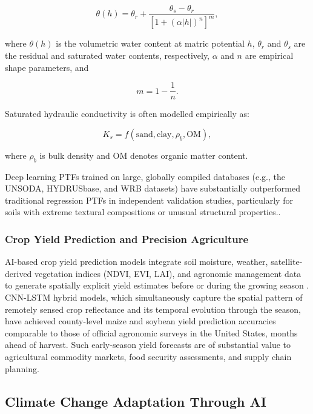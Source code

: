 \documentclass[land,article,submit,pdftex,moreauthors]{Definitions/mdpi}
\numberwithin{equation}{section}
\begin{document}
\begin{equation}
\theta(h)
=
\theta_r
+
\frac{
\theta_s-\theta_r
}{
\left[
1+(\alpha |h|)^n
\right]^m
},
\end{equation}

where $\theta(h)$ is the volumetric water content at matric potential $h$, $\theta_r$ and $\theta_s$ are the residual and saturated water contents, respectively, $\alpha$ and $n$ are empirical shape parameters, and

\begin{equation}
m = 1 - \frac{1}{n}.
\end{equation}

Saturated hydraulic conductivity is often modelled empirically as:

\begin{equation}
K_s
=
f(\text{sand},\text{clay},\rho_b,\text{OM}),
\end{equation}

where $\rho_b$ is bulk density and OM denotes organic matter content.

Deep learning PTFs trained on large, globally compiled databases (e.g., the UNSODA, HYDRUSbase, and WRB datasets) have substantially outperformed traditional regression PTFs in independent validation studies, particularly for soils with extreme textural compositions or unusual structural properties.\citep{zhang2018deep}.

\subsubsection{Crop Yield Prediction and Precision Agriculture}

AI-based crop yield prediction models integrate soil moisture, weather, satellite-derived vegetation indices (NDVI, EVI, LAI), and agronomic management data to generate spatially explicit yield estimates before or during the growing season \citep{you2017deep}. CNN-LSTM hybrid models, which simultaneously capture the spatial pattern of remotely sensed crop reflectance and its temporal evolution through the season, have achieved county-level maize and soybean yield prediction accuracies comparable to those of official agronomic surveys in the United States, months ahead of harvest. Such early-season yield forecasts are of substantial value to agricultural commodity markets, food security assessments, and supply chain planning.

\subsection{Climate Change Adaptation Through AI}
\end{document}
